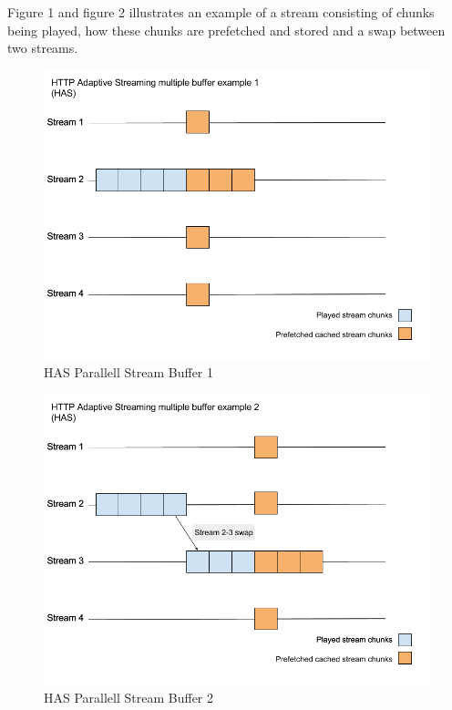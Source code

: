 \documentclass[9pt,a4paper]{acmproc}
\begin{document}
Figure 1 and figure 2 illustrates an example of a stream consisting of chunks being played, how these chunks are prefetched and stored and a swap between two streams.

\begin{figure}[!ht]
\begin{center}
\includegraphics[scale=0.3]{HAS1.png}
\caption{HAS Parallell Stream Buffer 1}
\end{center}
\end{figure}

\begin{figure}[!ht]
\begin{center}
\includegraphics[scale=0.3]{HAS2.png}
\caption{HAS Parallell Stream Buffer 2}
\end{center}
\end{figure}
\end{document}
